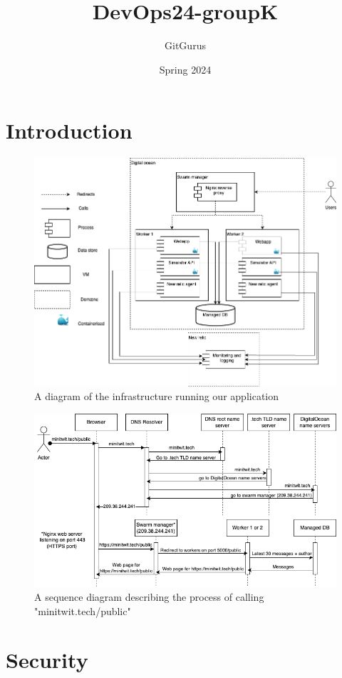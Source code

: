 \documentclass{article}
\title{DevOps24-groupK}
\author{GitGurus}
\date{Spring 2024}
\begin{document}
\maketitle

\section{Introduction}
\begin{figure}[H]
    \centering
    \includegraphics[width=\textwidth]{images/devops-overview.png}
    \caption{A diagram of the infrastructure running our application}
    \label{fig:infrastructure}
\end{figure}
\begin{figure}[H]
    \centering
    \includegraphics[width=\textwidth]{images/devops-sequence.png}
    \caption{A sequence diagram describing the process of calling "minitwit.tech/public"}
    \label{fig:sequence}
\end{figure}

\section{Security}
\end{document}
